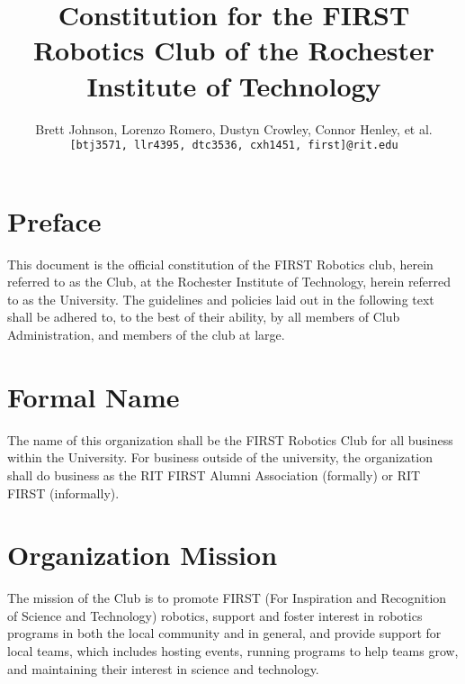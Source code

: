 \documentclass[english,11pt]{article}
\renewcommand{\footrulewidth}{1pt} %
\begin{document}
\title{Constitution for the FIRST Robotics Club of the Rochester Institute of Technology}
\author{
    Brett Johnson, Lorenzo Romero, Dustyn Crowley, Connor Henley, et al.  %
    \\
    \texttt{[btj3571, llr4395, dtc3536, cxh1451, first]@rit.edu}
}
\date{} %

\fancypagestyle{plain}{
    \fancyhf{}
    \rfoot{\today}
    \renewcommand{\footrulewidth}{0pt} %
}

\maketitle
\newpage %


\section*{Preface}
This document is the official constitution of the FIRST Robotics club, herein referred to as the Club, at the Rochester Institute of Technology, herein referred to as the University.
The guidelines and policies laid out in the following text shall be adhered to, to the best of their ability, by all members of Club Administration, and members of the club at large.

\section{Formal Name} \label{art:formal-name}
The name of this organization shall be the FIRST Robotics Club for all business within the University.
For business outside of the university, the organization shall do business as the RIT FIRST Alumni Association (formally) or RIT FIRST (informally).

\section{Organization Mission} \label{art:mission}
The mission of the Club is to promote FIRST (For Inspiration and Recognition of Science and Technology) robotics, support and foster interest in robotics programs in both the local community and in general, and provide support for local teams, which includes hosting events, running programs to help teams grow, and maintaining their interest in science and technology.
\end{document}
